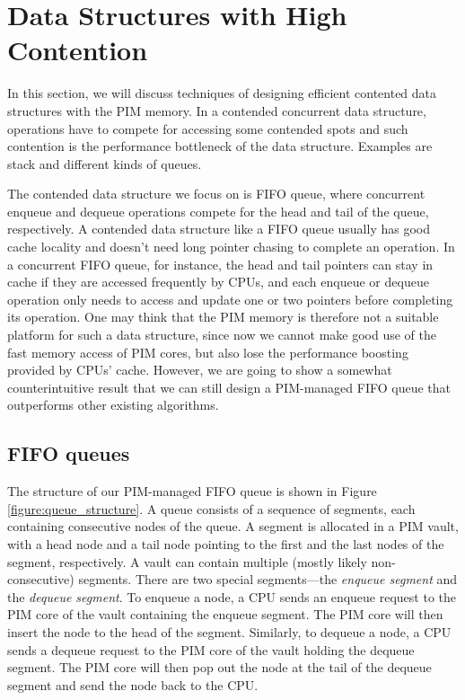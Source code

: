 
\section{Data Structures with High Contention}
\label{section:contended}
In this section, we will discuss techniques of designing efficient contented data structures 
with the PIM memory.
In a contended concurrent data structure, operations have to compete for accessing some 
contended spots and such contention is the performance bottleneck of the data structure.
Examples are stack and different kinds of queues.

The contended data structure we focus on is FIFO queue, where concurrent enqueue
and dequeue operations compete for the head and tail of the queue, respectively.
A contended data structure like a FIFO queue usually has good cache locality
and doesn't need long pointer chasing to complete an operation.
In a concurrent FIFO queue, for instance, the head and tail pointers can stay in
cache if they are accessed frequently by CPUs, and each enqueue or dequeue
operation only needs to access and update one or two pointers before completing its operation.
One may think that the PIM memory is therefore not a suitable platform for such a data structure,
since now we cannot make good use of the fast memory access of PIM cores, but also
lose the performance boosting provided by CPUs' cache.
However, we are going to show a somewhat counterintuitive result that we can still design
a PIM-managed FIFO queue that outperforms other existing algorithms.

\subsection{FIFO queues}
The structure of our PIM-managed FIFO queue is shown in Figure \ref{figure:queue_structure}.
A queue consists of a sequence of segments, each containing consecutive nodes of the queue.
A segment is allocated in a PIM vault, with a head node and a tail node pointing to the first 
and the last nodes of the segment, respectively.
A vault can contain multiple (mostly likely non-consecutive) segments. 
There are two special segments---the \emph{enqueue segment} and the \emph{dequeue segment}.
To enqueue a node, a CPU sends an enqueue request to the PIM core of the vault 
containing the enqueue segment.
The PIM core will then insert the node to the head of the segment.
Similarly, to dequeue a node, a CPU sends a dequeue request to the PIM core of the vault
holding the dequeue segment. 
The PIM core will then pop out the node at the tail of the dequeue segment and 
send the node back to the CPU.

